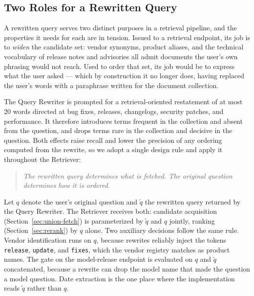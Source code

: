 
\subsection{Two Roles for a Rewritten Query}\label{sec:rewrite-roles}

A rewritten query serves two distinct purposes in a retrieval pipeline,
and the properties it needs for each are in tension. Issued to a
retrieval endpoint, its job is to \emph{widen} the candidate set:
vendor synonyms, product aliases, and the technical vocabulary of
release notes and advisories all admit documents the user's own
phrasing would not reach. Used to order that set, its job would be to
express what the user asked --- which by construction it no longer
does, having replaced the user's words with a paraphrase written for
the document collection.

The Query Rewriter is prompted for a retrieval-oriented restatement of
at most 20 words directed at bug fixes, releases, changelogs, security
patches, and performance. It therefore introduces terms frequent in the
collection and absent from the question, and drops terms rare in the
collection and decisive in the question. Both effects raise recall and
lower the precision of any ordering computed from the rewrite, so we
adopt a single design rule and apply it throughout the Retriever:

\begin{quote}
\emph{The rewritten query determines what is fetched. The original
question determines how it is ordered.}
\end{quote}

Let $q$ denote the user's original question and $\tilde{q}$ the
rewritten query returned by the Query Rewriter. The Retriever receives
both: candidate acquisition (Section~\ref{sec:union-fetch}) is
parameterized by $\tilde{q}$ and $q$ jointly, ranking
(Section~\ref{sec:rerank}) by $q$ alone. Two auxiliary decisions follow
the same rule. Vendor identification runs on $q$, because rewrites
reliably inject the tokens \texttt{release}, \texttt{update}, and
\texttt{fixes}, which the vendor registry matches as product names. The
gate on the model-release endpoint is evaluated on $q$ and $\tilde{q}$
concatenated, because a rewrite can drop the model name that made the
question a model question. Date extraction is the one place where the
implementation reads $\tilde{q}$ rather than $q$.

